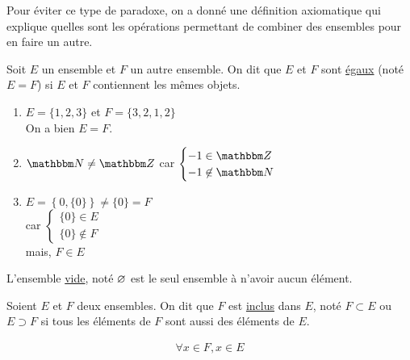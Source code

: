 Pour éviter ce type de paradoxe, on a donné une définition axiomatique qui explique quelles sont les opérations permettant de combiner des ensembles pour en faire un autre.
\vspace{1cm}

\begin{defn}
	Soit $E$ un ensemble et $F$ un autre ensemble. On dit que $E$ et $F$ sont \underline{égaux} (noté $E = F$) si $E$ et $F$ contiennent les mêmes objets.
\end{defn}

\begin{exm}
	\begin{enumerate}
		\item $E = \{1,2,3\}$ et $F = \{3,2,1,2\}$ \\
			On a bien $E = F$.
		\item $\N \neq \Z$ car $\begin{cases}
				-1 \in \Z\\
				-1 \not\in \N
			\end{cases}$ 
		\item $E = \left\{ 0, \{0\}  \right\} \neq \{0\} = F$\\
			car $\begin{cases}
				\{0\} \in E\\
				\{0\} \not\in F
			\end{cases}$ \\
			mais, $F \in E$
	\end{enumerate}
\end{exm}

\begin{defn}
	L'ensemble \underline{vide}, noté $\varnothing$ est le seul ensemble à n'avoir aucun élément.
\end{defn}

\begin{defn}
	Soient $E$ et $F$ deux ensembles. On dit que $F$ est \underline{inclus} dans $E$, noté $F\subset E$ ou $E \supset F$ si tous les éléments de $F$ sont aussi des éléments de $E$.\\
	\begin{wrapfigure}{l}{0.7\textwidth}
		\centering
		\vspace{-1cm}
	\end{wrapfigure}
	\begin{align*}
		\forall x\in F, x \in E
	\end{align*}
	\vspace{3cm}
\end{defn}

